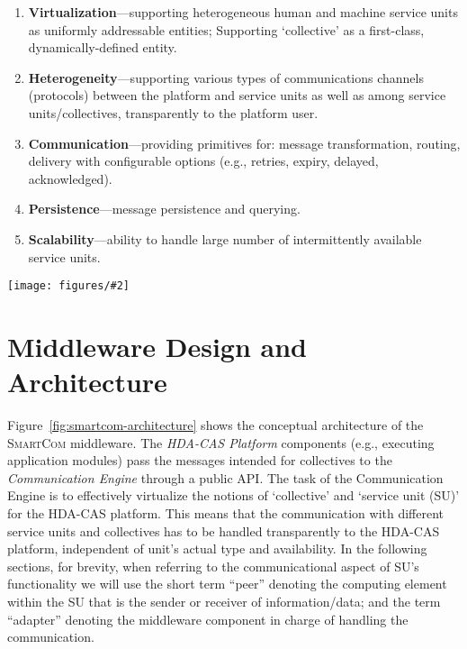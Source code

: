 \documentclass{llncs}
\newcommand{\mdl}{\textsc{SmartCom}}
\newcommand{\figfull}[3][0.9]{
\begin{figure*}[t]
\centering
\texttt{[image: figures/\#2]}
\caption{#3}
\label{fig:#2}
\end{figure*}
}
\begin{document}
      \begin{enumerate}
        \item \textbf{Virtualization}---supporting heterogeneous human and machine service units as uniformly addressable entities; Supporting `collective' as a first-class, dynamically-defined entity.
        \item \textbf{Heterogeneity}---supporting various types of communications channels (protocols) between the platform and service units as well as among service units/collectives, transparently to the platform user.
        \item \textbf{Communication}---providing primitives for: message transformation, routing, delivery with configurable options (e.g., retries, expiry, delayed, acknowledged).
        \item \textbf{Persistence}---message persistence and querying.
        \item \textbf{Scalability}---ability to handle large number of intermittently available service units.
      \end{enumerate}
      

\figfull[1.]{smartcom-architecture}{Simplified architecture of the \mdl{} middleware.}

\section{Middleware Design and Architecture}
\label{sec:middleware}


  Figure~\ref{fig:smartcom-architecture} shows the conceptual architecture of the \mdl{} middleware. The \emph{HDA-CAS Platform} components (e.g., executing application modules) pass the messages intended for collectives to the \emph{Communication Engine} through a public API. The task of the Communication Engine is to effectively virtualize the notions of `collective' and `service unit (SU)' for the HDA-CAS platform. This means that the communication with different service units and collectives has to be handled transparently to the HDA-CAS platform, independent of unit's actual type and availability. 
  In the following sections, for brevity, when referring to the communicational aspect of SU's functionality we will use the short term ``peer'' denoting the computing element within the SU that is the sender or receiver of information/data; and the term ``adapter'' denoting the middleware component in charge of handling the communication.
\end{document}

